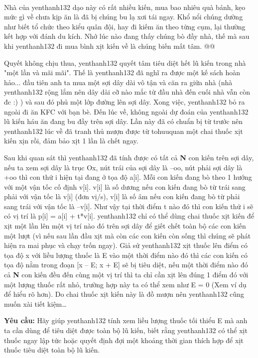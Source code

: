  

Nhà của yenthanh132 dạo này có rất nhiều kiến, mua bao nhiêu quà bánh, kẹo mức gì về chưa kịp ăn là đã bị chúng bu lạ xơi tái ngay. Khổ nổi chúng dường như biết tổ chức theo kiểu quân đội, hay đi kiếm ăn theo từng cụm, lại thường kết hợp với đánh du kích. Nhớ lúc nào đang thấy chúng bò đầy nhà, thế mà sau khi yenthanh132 đi mua bình xịt kiến về là chúng biến mất tâm. @@

Quyết không chịu thua, yenthanh132 quyết tâm tiêu diệt hết lũ kiến trong nhà "một lần và mãi mãi". Thế là yenthanh132 đã nghĩ ra được một kế sách hoàn hảo... đầu tiên anh ta mua một sợi dây dài vô tận và căn ra giữa nhà (nhà yenthanh132 rộng lắm nên dây dài cỡ nào mắc từ đầu nhà đến cuối nhà vẫn còn đc :) ) và sau đó phủ một lớp đường lên sợi dây. Xong việc, yenthanh132 bỏ ra ngoài đi ăn KFC với bạn bè. Đến lúc về, không ngoài dự đoán của yenthanh132 lũ kiến háu ăn đang bu đầy trên sợi dây. Lần này đã có chuẩn bị từ trước nên yenthanh132 lúc về đã tranh thủ mượn được từ tohuuquan một chai thuốc xịt kiến xịn rồi, đảm bảo xịt 1 lần là chết ngay.

Sau khi quan sát thì yenthanh132 đã tính được có tất cả \textbf{ N } con kiến trên sợi dây, nếu ta xem sợi dây là trục Ox, nút trái của sợi dây là –oo, nút phải sợi dây là +oo thì con thứ i hiện tại đang ở tọa độ a[i]. Mỗi con kiến đang bò theo 1 hướng với một vận tốc cố định v[i]. v[i] là số dương nếu con kiến đang bò từ trái sang phải với vận tốc là v[i] (đơn vị/s), v[i] là số âm nếu con kiến đang bò từ phải sang trái với vận tốc là –v[i]. Như vậy tại thời điểm t nào đó thì con kiến thứ i sẽ có vị trí là p[i] = a[i] + t*v[i]. yenthanh132 chỉ có thể dùng chai thuốc xịt kiến để xịt một lần lên một vị trí nào đó trên sợi dây để giết chết toàn bộ các con kiến một lượt (vì nếu sau lần đầu xịt mà còn các con kiến còn sống thì chúng sẽ phát hiện ra mai phục và chạy trốn ngay). Giả sử yenthanh132 xịt thuốc lên điểm có tọa độ x với liều lượng thuốc là E vào một thời điểm nào đó thì các con kiến có tọa độ nằm trong đoạn [x – E; x + E] sẽ bị tiêu diệt, nếu một thời điểm nào đó cả \textbf{ N } con kiến đều đến cùng một vị trí thì ta chỉ cần xịt lên đúng 1 điểm đó với một lượng thuốc rất nhỏ, trường hợp này ta có thể xem như E = 0 (Xem ví dụ để hiểu rõ hơn). Do chai thuốc xịt kiến này là đồ mượn nên yenthanh132 cũng muốn xài tiết kiệm…

\textbf{Yêu cầu: } Hãy giúp yenthanh132 tính xem liều lượng thuốc tối thiểu E mà anh ta cần dùng để tiêu diệt được toàn bộ lũ kiến, biết rằng yenthanh132 có thể xịt thuốc ngay lập tức hoặc quyết định đợi một khoảng thời gian thích hợp để xịt thuốc tiêu diệt toàn bộ lũ kiến.